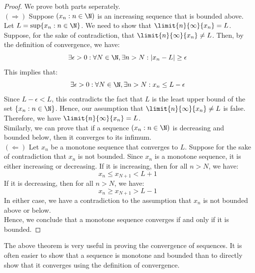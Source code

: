 \documentclass[openany]{book}
\begin{document}
\begin{proof}
    We prove both parts seperately. \\
    $(\Rightarrow)$ Suppose $(x_n : n \in \N)$ is an increasing sequence that is bounded above. Let $L = \sup\{x_n : n \in \N\}$. We need to show that $\limit{n}{\infty}{x_n} = L$. \\
    Suppose, for the sake of contradiction, that $\limit{n}{\infty}{x_n} \neq L$. Then, by the definition of convergence, we have:
    $$\exists \epsilon > 0: \forall N \in \N, \exists n > N: |x_n - L| \geq \epsilon$$
    This implies that:
    $$\exists \epsilon > 0: \forall N \in \N, \exists n > N: x_n \leq L - \epsilon$$
    Since $L - \epsilon < L$, this contradicts the fact that $L$ is the least upper bound of the set $\{x_n : n \in \N\}$. Hence, our assumption that $\limit{n}{\infty}{x_n} \neq L$ is false. Therefore, we have $\limit{n}{\infty}{x_n} = L$. \\
    Similarly, we can prove that if a sequence $(x_n : n \in \N)$ is decreasing and bounded below, then it converges to its infimum. \\
    $(\Leftarrow)$ Let $x_n$ be a monotone sequence that converges to $L$. Suppose for the sake of contradiction that $x_n$ is not bounded. 
    Since $x_n$ is a monotone sequence, it is either increasing or decreasing. If it is increasing, then for all $n > N$, we have:
    $$x_n \leq x_{N+1} < L + 1$$
    If it is decreasing, then for all $n > N$, we have:
    $$x_n \geq x_{N+1} > L - 1$$
    In either case, we have a contradiction to the assumption that $x_n$ is not bounded above or below. \\
    Hence, we conclude that a monotone sequence converges if and only if it is bounded.
\end{proof}
\begin{mynote}
    The above theorem is very useful in proving the convergence of sequences. It is often easier to show that a sequence is monotone and bounded than to directly show that it converges using the definition of convergence.
\end{mynote}
\end{document}
